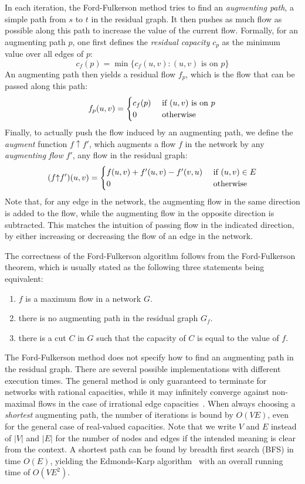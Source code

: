 \documentclass{llncs}
\begin{document}
In each iteration, the Ford-Fulkerson method tries to find an \emph{augmenting path}, \ie a simple path from $s$ to $t$ in the residual graph.
It then pushes as much flow as possible along this path to increase the value of the current flow. 
Formally, for an augmenting path $p$, one first defines the \emph{residual capacity} $c_p$ as the minimum value over all edges of $p$:
\[c_f(p) = \min \{c_f(u, v): \text{$(u, v)$ is on  $p$}\}\]
An augmenting path then yields a residual flow $f_p$, which is the flow that can be passed along this path:
\[ f_p (u, v) = 
  \begin{cases}
  c_f(p) \hfill & \text{ if $(u, v)$ is on $p$} \\  
  0 \hfill & \text{ otherwise} \\
  \end{cases} 
\]
\newcommand{\augment}{{\mathbin\uparrow}}%
Finally, to actually push the flow induced by an augmenting path, we define the \emph{augment} function $f\augment f'$, which augments a flow $f$ in the network 
by any \emph{augmenting flow} $f'$, \ie any flow in the residual graph:
\[ (f \augment f') (u, v) = 
  \begin{cases}
  f (u, v) + f'(u, v) - f'(v, u) \hfill & \text{ if $(u, v) \in E$} \\  
  0 \hfill & \text{ otherwise} \\
  \end{cases} 
\]
Note that, for any edge in the network, the augmenting flow in the same direction is added to the flow, while the augmenting flow in the opposite direction is subtracted. 
This matches the intuition of passing flow in the indicated direction, by either increasing or decreasing the flow of an edge in the network.

The correctness of the Ford-Fulkerson algorithm follows from the Ford-Fulkerson theorem, which is usually stated as the following three statements being equivalent:
\begin{enumerate}
\item $f$ is a maximum flow in a network $G$.
\item there is no augmenting path in the residual graph $G_f$.
\item there is a cut $C$ in $G$ such that the capacity of $C$ is equal to the value of $f$.
\end{enumerate}

The Ford-Fulkerson method does not specify how to find an augmenting path in the residual graph. There are several possible implementations with different execution times. The general method is only guaranteed to terminate for networks with rational capacities, while it may infinitely converge against non-maximal flows in the case of irrational edge capacities~\cite{FF56,Zwick95}. When always choosing a \emph{shortest} augmenting path, the number of iterations is bound by $O(VE)$, even for the general case of real-valued capacities. Note that we write $V$ and $E$ instead of $|V|$ and $|E|$ for the number of nodes and edges if the intended meaning is clear from the context.
A shortest path can be found by breadth first search (BFS) in time $O(E)$, yielding the Edmonds-Karp algorithm~\cite{EK72} with an overall running time of $O(VE^2)$. 
\end{document}
